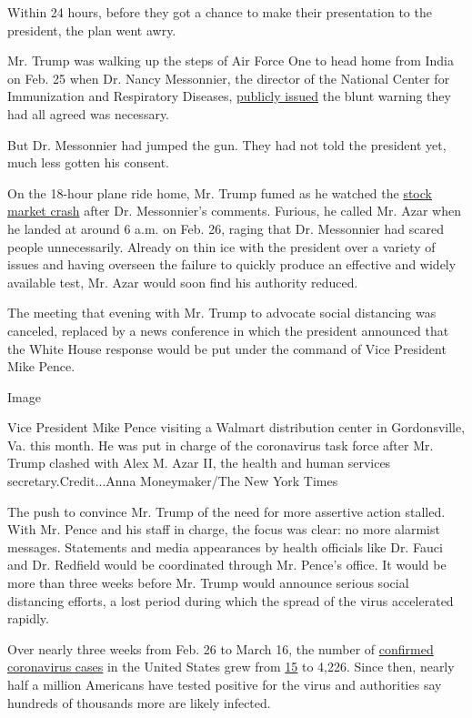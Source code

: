 Within 24 hours, before they got a chance to make their presentation to
the president, the plan went awry.

Mr. Trump was walking up the steps of Air Force One to head home from
India on Feb. 25 when Dr. Nancy Messonnier, the director of the National
Center for Immunization and Respiratory Diseases,
\href{https://www.cdc.gov/media/releases/2020/t0225-cdc-telebriefing-covid-19.html}{publicly
issued} the blunt warning they had all agreed was necessary.

But Dr. Messonnier had jumped the gun. They had not told the president
yet, much less gotten his consent.

On the 18-hour plane ride home, Mr. Trump fumed as he watched the
\href{https://www.nytimes3xbfgragh.onion/2020/02/24/business/stock-market-coronavirus.html}{stock
market crash} after Dr. Messonnier's comments. Furious, he called Mr.
Azar when he landed at around 6 a.m. on Feb. 26, raging that Dr.
Messonnier had scared people unnecessarily. Already on thin ice with the
president over a variety of issues and having overseen the failure to
quickly produce an effective and widely available test, Mr. Azar would
soon find his authority reduced.

The meeting that evening with Mr. Trump to advocate social distancing
was canceled, replaced by a news conference in which the president
announced that the White House response would be put under the command
of Vice President Mike Pence.

Image

Vice President Mike Pence visiting a Walmart distribution center in
Gordonsville, Va. this month. He was put in charge of the coronavirus
task force after Mr. Trump clashed with Alex M. Azar II, the health and
human services secretary.Credit...Anna Moneymaker/The New York Times

The push to convince Mr. Trump of the need for more assertive action
stalled. With Mr. Pence and his staff in charge, the focus was clear: no
more alarmist messages. Statements and media appearances by health
officials like Dr. Fauci and Dr. Redfield would be coordinated through
Mr. Pence's office. It would be more than three weeks before Mr. Trump
would announce serious social distancing efforts, a lost period during
which the spread of the virus accelerated rapidly.

Over nearly three weeks from Feb. 26 to March 16, the number of
\href{https://www.nytimes3xbfgragh.onion/interactive/2020/us/coronavirus-us-cases.html\#map}{confirmed
coronavirus cases} in the United States grew from
\href{https://www.cdc.gov/media/releases/2020/s0226-Covid-19-spread.html}{15}
to 4,226. Since then, nearly half a million Americans have tested
positive for the virus and authorities say hundreds of thousands more
are likely infected.

